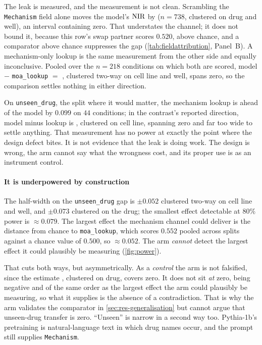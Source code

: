 The leak is measured, and the measurement is not clean. Scrambling the
\texttt{Mechanism} field alone moves the model's $\textrm{NIR}$ by
 ($n = \num{738}$, clustered on drug and well), an
interval containing zero. That understates the channel; it does not bound it,
because this row's swap partner scores $0.520$, above chance, and a comparator
above chance suppresses the gap (\cref{tab:fieldattribution}, Panel~B). A
mechanism-only lookup is the same measurement from the other side and equally
inconclusive. Pooled over the $n = \num{218}$ conditions on which both are
scored, model $-$ \texttt{moa\_lookup} $=$ ,
clustered two-way on cell line and well, spans zero, so the comparison settles
nothing in either direction.

On \texttt{unseen\_drug}, the split where it would matter, the mechanism lookup
is ahead of the model by $0.099$ on $44$ conditions; in the contrast's reported
direction, model minus lookup is , clustered on cell
line, spanning zero and far too wide to settle anything. That measurement has no
power at exactly the point where the design defect bites. It is not evidence
that the leak is doing work. The design is wrong, the arm cannot say what the
wrongness cost, and its proper use is as an instrument control.

\paragraph{It is underpowered by construction} The half-width on the
\texttt{unseen\_drug} gap is $\pm 0.052$ clustered two-way on cell line and
well, and $\pm 0.073$ clustered on the drug; the smallest effect detectable at
$80\%$ power is $\approx 0.079$. The largest effect the mechanism channel could
deliver is the distance from chance to \texttt{moa\_lookup}, which scores
$0.552$ pooled across splits against a chance value of $0.500$, so $\approx
0.052$. The arm \emph{cannot} detect the largest effect it could plausibly be
measuring (\cref{fig:power}).



That cuts both ways, but asymmetrically. As a \emph{control} the arm is not
falsified, since the estimate , clustered on drug,
covers zero. It does not sit \emph{at} zero, being negative and of the same
order as the largest effect the arm could plausibly be measuring, so what it
supplies is the absence of a contradiction. That is why the arm validates the
comparator in \cref{sec:res-generalisation} but cannot argue that unseen-drug
transfer is zero. ``Unseen'' is narrow in a second way too. Pythia-1b's
pretraining is natural-language text in which drug names occur, and the
prompt still supplies \texttt{Mechanism}.

